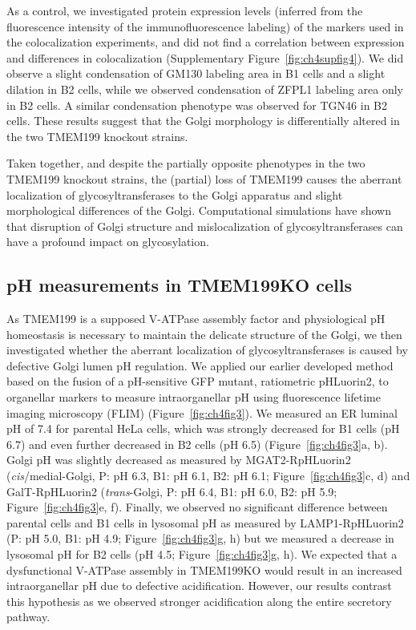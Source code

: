 As a control, we investigated protein expression levels (inferred from the fluorescence intensity of the immunofluorescence labeling) of the markers used in the colocalization experiments, and did not find a correlation between expression and differences in colocalization (Supplementary Figure~\ref{fig:ch4supfig4}). We did observe a slight condensation of GM130 labeling area in B1 cells and a slight dilation in B2 cells, while we observed condensation of ZFPL1 labeling area only in B2 cells. A similar condensation phenotype was observed for TGN46 in B2 cells. These results suggest that the Golgi morphology is differentially altered in the two TMEM199 knockout strains.

Taken together, and despite the partially opposite phenotypes in the two TMEM199 knockout strains, the (partial) loss of TMEM199 causes the aberrant localization of glycosyltransferases to the Golgi apparatus and slight morphological differences of the Golgi. Computational simulations have shown that disruption of Golgi structure and mislocalization of glycosyltransferases can have a profound impact on glycosylation\cite{jaiman_golgi_2020}.

\subsection{pH measurements in TMEM199KO cells}

As TMEM199 is a supposed V-ATPase assembly factor and physiological pH homeostasis is necessary to maintain the delicate structure of the Golgi\cite{gawlitzek_ammonium_2000,linders_sugary_2020,fisher_bridging_2016,rivinoja_elevated_2009,maeda_chapter_2010}, we then investigated whether the aberrant localization of glycosyltransferases is caused by defective Golgi lumen pH regulation. We applied our earlier developed method based on the fusion of a pH-sensitive GFP mutant, ratiometric pHLuorin2\cite{mahon_phluorin2:_2011,miesenbock_visualizing_1998}, to organellar markers to measure intraorganellar pH using fluorescence lifetime imaging microscopy (FLIM)\cite{linders_fluorescence_2021} (Figure~\ref{fig:ch4fig3}). We measured an ER luminal pH of 7.4 for parental HeLa cells, which was strongly decreased for B1 cells (pH 6.7) and even further decreased in B2 cells (pH 6.5) (Figure~\ref{fig:ch4fig3}a, b). Golgi pH was slightly decreased as measured by MGAT2-RpHLuorin2 (\emph{cis}/medial-Golgi, P: pH 6.3, B1: pH 6.1, B2: pH 6.1; Figure~\ref{fig:ch4fig3}c, d) and GalT-RpHLuorin2 (\emph{trans}-Golgi, P: pH 6.4, B1: pH 6.0, B2: pH 5.9; Figure~\ref{fig:ch4fig3}e, f). Finally, we observed no significant difference between parental cells and B1 cells in lysosomal pH as measured by LAMP1-RpHLuorin2 (P: pH 5.0, B1: pH 4.9; Figure~\ref{fig:ch4fig3}g, h) but we measured a decrease in lysosomal pH for B2 cells (pH 4.5; Figure~\ref{fig:ch4fig3}g, h). We expected that a dysfunctional V-ATPase assembly in TMEM199KO would result in an increased intraorganellar pH due to defective acidification. However, our results contrast this hypothesis as we observed stronger acidification along the entire secretory pathway.

